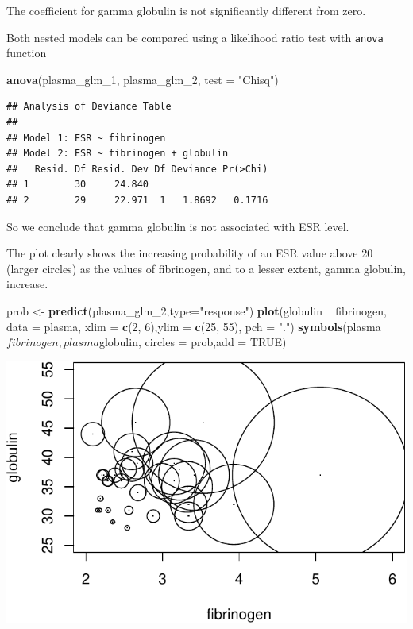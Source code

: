 \documentclass[]{article}
\newenvironment{Shaded}{\begin{snugshade}}{\end{snugshade}}
\newcommand{\KeywordTok}[1]{\textcolor[rgb]{0.13,0.29,0.53}{\textbf{{#1}}}}
\newcommand{\DataTypeTok}[1]{\textcolor[rgb]{0.13,0.29,0.53}{{#1}}}
\newcommand{\DecValTok}[1]{\textcolor[rgb]{0.00,0.00,0.81}{{#1}}}
\newcommand{\StringTok}[1]{\textcolor[rgb]{0.31,0.60,0.02}{{#1}}}
\newcommand{\OtherTok}[1]{\textcolor[rgb]{0.56,0.35,0.01}{{#1}}}
\newcommand{\NormalTok}[1]{{#1}}
\numberwithin{equation}{section}
\begin{document}
The coefficient for gamma globulin is not significantly different from
zero.

Both nested models can be compared using a likelihood ratio test with
\texttt{anova} function

\begin{Shaded}
\begin{Highlighting}[]
\KeywordTok{anova}\NormalTok{(plasma_glm_1, plasma_glm_2, }\DataTypeTok{test =} \StringTok{"Chisq"}\NormalTok{)}
\end{Highlighting}
\end{Shaded}

\begin{verbatim}
## Analysis of Deviance Table
## 
## Model 1: ESR ~ fibrinogen
## Model 2: ESR ~ fibrinogen + globulin
##   Resid. Df Resid. Dev Df Deviance Pr(>Chi)
## 1        30     24.840                     
## 2        29     22.971  1   1.8692   0.1716
\end{verbatim}

So we conclude that gamma globulin is not associated with ESR level.

The plot clearly shows the increasing probability of an ESR value above
20 (larger circles) as the values of fibrinogen, and to a lesser extent,
gamma globulin, increase.

\begin{Shaded}
\begin{Highlighting}[]
\NormalTok{prob <-}\StringTok{ }\KeywordTok{predict}\NormalTok{(plasma_glm_2,}\DataTypeTok{type=}\StringTok{"response"}\NormalTok{)}
\KeywordTok{plot}\NormalTok{(globulin ~}\StringTok{ }\NormalTok{fibrinogen, }\DataTypeTok{data =} \NormalTok{plasma, }\DataTypeTok{xlim =} \KeywordTok{c}\NormalTok{(}\DecValTok{2}\NormalTok{, }\DecValTok{6}\NormalTok{),}\DataTypeTok{ylim =} \KeywordTok{c}\NormalTok{(}\DecValTok{25}\NormalTok{, }\DecValTok{55}\NormalTok{), }\DataTypeTok{pch =} \StringTok{"."}\NormalTok{)}
\KeywordTok{symbols}\NormalTok{(plasma$fibrinogen, plasma$globulin, }\DataTypeTok{circles =} \NormalTok{prob,}\DataTypeTok{add =} \OtherTok{TRUE}\NormalTok{)}
\end{Highlighting}
\end{Shaded}

\includegraphics{index_files/figure-latex/unnamed-chunk-234-1.pdf}
\end{document}

